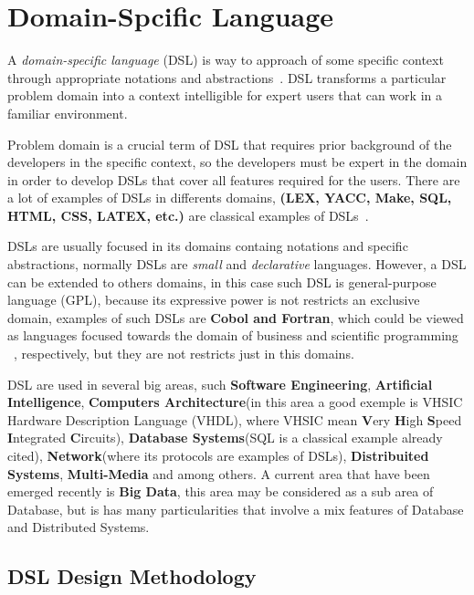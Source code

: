 \chapter{Domain-Spcific Language} %
\label{cha:dsl}

A \textit{domain-specific language} (DSL) is way to approach of some specific
context through appropriate notations and abstractions~\cite{deursen:2000}. DSL
transforms a particular problem domain into a context intelligible for expert
users that can work in a familiar environment.

Problem domain is a crucial term of DSL that requires prior background of the
developers in the specific context, so the developers must be expert in the domain
in order to develop DSLs that cover all features required for the users. There are
a lot of examples of DSLs in differents domains, \textbf{(LEX, YACC, Make, SQL,
HTML, CSS, LATEX, etc.)} are classical examples of DSLs~\cite{bentley:1986}.

DSLs are usually focused in its domains containg notations and specific abstractions,
normally DSLs are \textit{small} and \textit{declarative} languages. However, a
DSL can be extended to others domains, in this case such DSL is
general-purpose language (GPL), because its expressive power is not restricts
an exclusive domain, examples of such DSLs are \textbf{Cobol and Fortran}, which
could be viewed as languages focused towards the domain of business and scientific
programming  ~\cite{deursen:2000}, respectively, but they are not restricts just
in this domains.

DSL are used in several big areas, such \textbf{Software Engineering}, 
\textbf{Artificial Intelligence}, \textbf{Computers Architecture}(in this area a
good exemple is VHSIC Hardware Description Language (VHDL), where VHSIC mean 
{\bf V}ery {\bf H}igh {\bf S}peed {\bf I}ntegrated {\bf C}ircuits), \textbf{Database
Systems}(SQL is a classical example already cited), \textbf{Network}(where its
protocols are examples of DSLs), \textbf{Distribuited Systems}, \textbf{Multi-Media}
and among others. A current area that have been emerged recently is \textbf{Big Data},
this area may be considered as a sub area of Database, but is has many
particularities that involve a mix features of Database and Distributed Systems.

\section{DSL Design Methodology}

